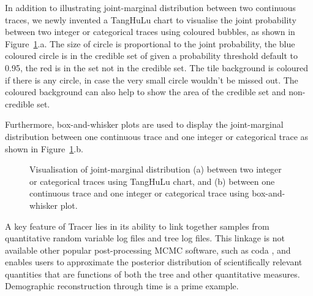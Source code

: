 \documentclass{bioinfo}
\begin{document}
In addition to illustrating joint-marginal distribution between two continuous traces, we newly invented a TangHuLu chart to visualise the joint probability between two integer or categorical traces using coloured bubbles, as shown in Figure~\ref{fig:tanghulu}.a. The size of circle is proportional to the joint probability, the blue coloured circle is in the credible set of given a probability threshold default to 0.95, the red is in the set not in the credible set. The tile background is coloured if there is any circle, in case the very small circle wouldn't be missed out. The coloured background can also help to show the area of the credible set and non-credible set.

Furthermore, box-and-whisker plots are used to display the joint-marginal distribution between one continuous trace and one integer or categorical trace as shown in Figure~\ref{fig:tanghulu}.b.

\begin{figure}[ht]
\caption{Visualisation of joint-marginal distribution (a) between two integer or categorical traces using TangHuLu chart, and (b) between one continuous trace and one integer or categorical trace using box-and-whisker plot.}
\label{fig:tanghulu}
\end{figure}

A key feature of Tracer lies in its ability to link together samples from quantitative random variable log files and tree log files.
This linkage is not available other popular post-processing MCMC software, such as coda \cite{citeref}, and enables users to approximate the posterior distribution of scientifically relevant quantities that are functions of both the tree and other quantitative measures.
Demographic reconstruction through time is a prime example.
\end{document}
